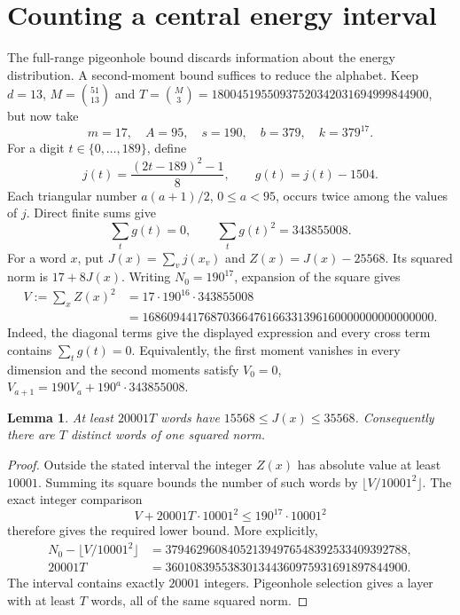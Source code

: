\documentclass[11pt]{article}
\newtheorem{lemma}{Lemma}
\begin{document}
\section{Counting a central energy interval}\label{sec:central}
The full-range pigeonhole bound discards information about the energy
distribution. A second-moment bound suffices to reduce the alphabet.
Keep \(d=13\), \(M=\binom{51}{13}\) and
\(T=\binom M3=18004519550937520342031694999844900\), but now take
\[
 m=17,\quad A=95,\quad s=190,\quad b=379,\quad k=379^{17}.
\]
For a digit \(t\in\{0,\ldots,189\}\), define
\[
 j(t)=\frac{(2t-189)^2-1}{8},\qquad g(t)=j(t)-1504.
\]
Each triangular number \(a(a+1)/2\), \(0\le a<95\), occurs twice
among the values of \(j\). Direct finite sums give
\[
 \sum_t g(t)=0,\qquad \sum_t g(t)^2=343855008.
\]
For a word \(x\), put \(J(x)=\sum_v j(x_v)\) and
\(Z(x)=J(x)-25568\). Its squared norm is \(17+8J(x)\).
Writing \(N_0=190^{17}\), expansion of the square gives
\begin{align*}
 V:=\sum_x Z(x)^2
   &=17\cdot190^{16}\cdot343855008\\
   &=16860944176870366476166331396160000000000000000.
\end{align*}
Indeed, the diagonal terms give the displayed expression and every
cross term contains \(\sum_t g(t)=0\). Equivalently, the first moment
vanishes in every dimension and the second moments satisfy
\(V_0=0\), \(V_{a+1}=190V_a+190^a\cdot343855008\).

\begin{lemma}\label{lem:central}
At least \(20001T\) words have \(15568\le J(x)\le35568\).
Consequently there are \(T\) distinct words of one squared norm.
\end{lemma}
\begin{proof}
Outside the stated interval the integer \(Z(x)\) has absolute value
at least \(10001\). Summing its square bounds the number of such words
by \(\lfloor V/10001^2\rfloor\). The exact integer comparison
\[
 V+20001T\cdot10001^2\le190^{17}\cdot10001^2
\]
therefore gives the required lower bound. More explicitly,
\begin{align*}
 N_0-\lfloor V/10001^2\rfloor
   &=379462960840521394976548392533409392788,\\
 20001T&=360108395538301344360975931691897844900.
\end{align*}
The interval contains exactly \(20001\) integers. Pigeonhole selection
gives a layer with at least \(T\) words, all of the same squared norm.
\end{proof}
\end{document}
